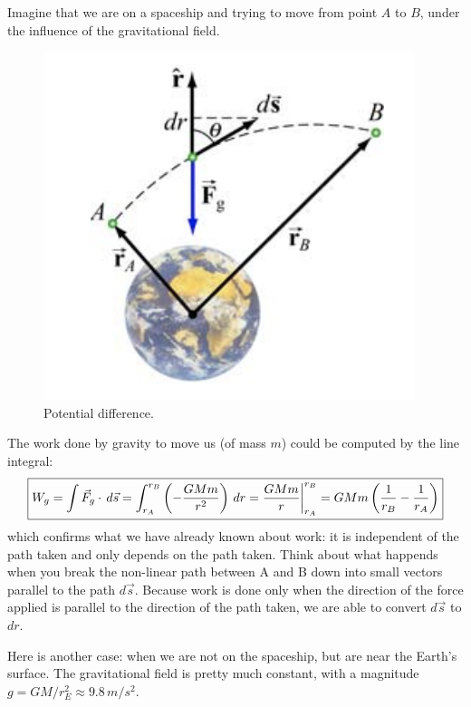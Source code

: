 \documentclass[11pt, letterpaper]{article}
\begin{document}
	Imagine that we are on a spaceship and trying to move from point $A$ to $B$, under the 
	influence of the gravitational field.
	\begin{figure}[h!]
		\centering
		\includegraphics[scale=0.6]{earth}
		\caption{Potential difference.}
		\label{fig:earth}
	\end{figure}
	
	\noindent The work done by gravity to move us (of mass $m$) could be computed by the line
	integral: 
	\begin{equation}\label{eqn:work-1}
		\centering
		\boxed{W_g = \int \vec{F}_g \cdot \, d\vec{s} = \int_{r_A}^{r_B} \left(-\frac{GMm}{r^2}\right) \,
		dr = \frac{GMm}{r}\bigg|_{r_A}^{r_B} = GMm \left( \frac{1}{r_B} - \frac{1}{r_A} \right)}
	\end{equation}
	which confirms what we have already known about work: it is independent of the path taken
	and only depends on the path taken. Think about what happends when you break the non-linear
	path between A and B down into small vectors parallel to the path $d\vec{s}$. Because work is
	done only when the direction of the force applied is parallel to the direction of the path taken, 
	we are able to convert $d\vec{s}$ to $dr$. 
	
	Here is another case: when we are not on the spaceship, but are near the Earth's surface. The 
	gravitational field is pretty much constant, with a magnitude $g=GM/r_E^2 \approx 9.8\, m/s^2$.
	
\end{document}
